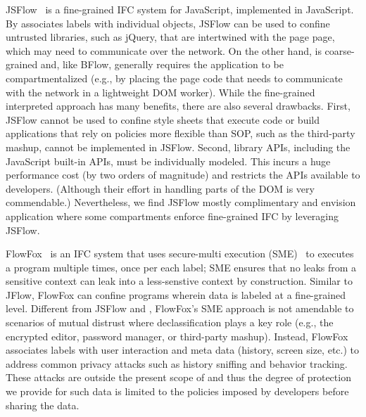 JSFlow~\cite{JSFlow} is a fine-grained IFC system for JavaScript,
implemented in JavaScript.
%
By associates labels with individual objects, JSFlow can be used to
confine untrusted libraries, such as jQuery, that are intertwined with
the page page, which may need to communicate over the network.
%
On the other hand, \sys{} is coarse-grained and, like BFlow, generally
requires the application to be compartmentalized (e.g., by placing the
page code that needs to communicate with the network in a lightweight
DOM worker).
%
While the fine-grained interpreted approach has many benefits, there
are also several drawbacks.
%
First, JSFlow cannot be used to confine style sheets that execute code
or build applications that rely on policies more flexible than SOP,
such as the third-party mashup, cannot be implemented in JSFlow.
%
%
Second, library APIs, including the JavaScript built-in APIs, must be
individually modeled.
%
This incurs a huge performance cost (by two orders of magnitude)
and restricts the APIs available to developers.
%
(Although their effort in handling parts of the DOM is very
commendable.)
%
Nevertheless, we find JSFlow mostly complimentary and envision
application where some \sys{} compartments enforce fine-grained IFC by
leveraging JSFlow.




FlowFox~\cite{DeGroef:2012} is an IFC system that uses secure-multi
execution (SME)~\cite{Devriese:2010} to executes a program multiple
times, once per each label; SME ensures that no leaks from a sensitive
context can leak into a less-senstive context by construction.
%
Similar to JFlow, FlowFox can confine programs wherein data is labeled
at a fine-grained level.
%
Different from JSFlow and \sys{}, FlowFox's SME approach is not
amendable to scenarios of mutual distrust where declassification plays
a key role (e.g., the encrypted editor, password manager, or
third-party mashup).
%
Instead, FlowFox associates labels with user interaction and meta data
(history, screen size, etc.) to address common privacy attacks such as
history sniffing and behavior tracking.
%
These attacks are outside the present scope of \sys{} and thus the
degree of protection we provide for such data is limited to the
policies imposed by developers before sharing the data.

